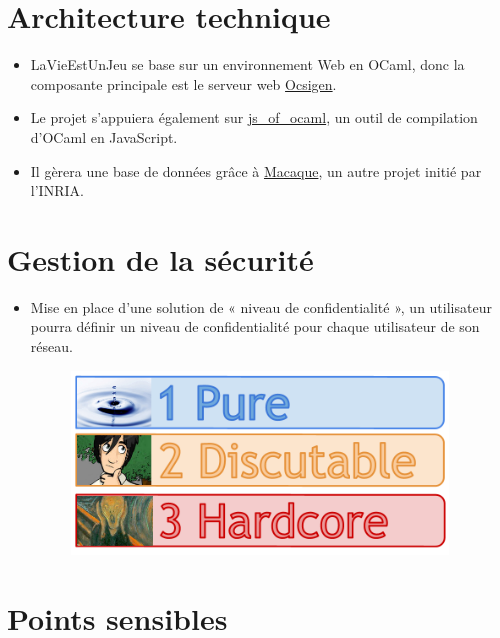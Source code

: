 \documentclass{life-fr}
\begin{document}
\section{Architecture technique}

\begin{itemize}
  \item LaVieEstUnJeu se base sur un environnement Web en OCaml, donc la composante principale est le serveur web \href{http://ocsigen.org/}{Ocsigen}.
  \item Le projet s’appuiera également sur \href{http://ocsigen.org/js_of_ocaml/}{js\_of\_ocaml}, un outil de compilation d’OCaml en JavaScript.
  \item Il gèrera une base de données grâce à \href{http://ocsigen.org/macaque/}{Macaque}, un autre projet initié par l’INRIA.
\end{itemize}

\section{Gestion de la sécurité}

\begin{itemize}
  \item Mise en place d’une solution de « niveau de confidentialité », un utilisateur pourra définir un niveau de confidentialité pour chaque utilisateur de son réseau. 

\begin{figure}[H]
  \begin{center}
    \includegraphics[width=10cm]{img/confidentialite.png}
  \end{center}
\end{figure}

\end{itemize}

\section{Points sensibles}
\end{document}
